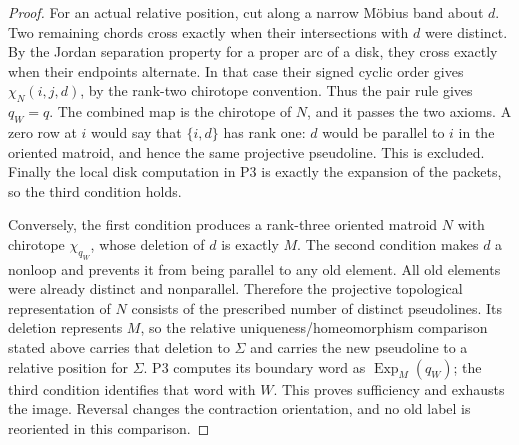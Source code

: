 \documentclass[11pt,a4paper]{article}
\begin{document}
\begin{proof}
For an actual relative position, cut along a narrow M\"obius band about
$d$.  Two remaining chords cross exactly when their intersections with
$d$ were distinct.  By the Jordan separation property for a proper arc
of a disk, they cross exactly when their endpoints alternate.  In that
case their signed cyclic order gives $\chi_N(i,j,d)$, by the
rank-two chirotope convention.  Thus the pair rule gives $q_W=q$.
The combined map is the chirotope of $N$, and it passes the two axioms.
A zero row at $i$ would say that $\{i,d\}$ has rank one: $d$ would be
parallel to $i$ in the oriented matroid, and hence the same projective
pseudoline.  This is excluded.  Finally the local disk computation in
P3 is exactly the expansion of the packets, so the third condition
holds.

Conversely, the first condition produces a rank-three oriented matroid
$N$ with chirotope $\chi_{q_W}$, whose deletion of $d$ is exactly $M$.
The second condition makes $d$ a nonloop and prevents it from being
parallel to any old element.  All old elements were already distinct
and nonparallel.  Therefore the projective topological representation
of $N$ consists of the prescribed number of distinct pseudolines.
Its deletion represents $M$, so the relative uniqueness/homeomorphism
comparison stated above carries that deletion to $\Sigma$ and carries
the new pseudoline to a relative position for $\Sigma$.  P3 computes
its boundary word as $\operatorname{Exp}_M(q_W)$; the third condition
identifies that word with $W$.  This proves sufficiency and exhausts
the image.  Reversal changes the contraction orientation, and no old
label is reoriented in this comparison.
\end{proof}
\end{document}
